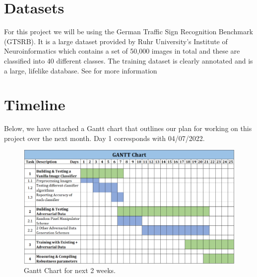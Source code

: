 \documentclass{article} %
\begin{document}

\section{Datasets}
For this project we will be using the German Traffic Sign Recognition Benchmark (GTSRB). 
It is a large dataset provided by Ruhr University’s Institute of Neuroinformatics which contains a set of 50,000 images in total and these are classified into 40 different classes. 
The training dataset is clearly annotated and is a large, lifelike database.
See \citet{Stallkamp2012} for more information

\section{Timeline}
Below, we have attached a Gantt chart that outlines our plan for working on this project over the next month. Day 1 corresponds with 04/07/2022. 

\begin{figure}[h]
\begin{center}
\includegraphics[width=13cm]{iclr2022/ProposalGantChart.png}
\end{center}
\caption{Gantt Chart for next 2 weeks.}
\end{figure}




\end{document}
